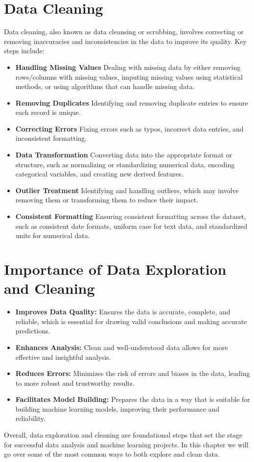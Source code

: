 \documentclass[
]{book}
\providecommand{\tightlist}{%
  \setlength{\itemsep}{0pt}\setlength{\parskip}{0pt}}
\begin{document}
\section*{Data Cleaning}\label{data-cleaning}

Data cleaning, also known as data cleansing or scrubbing, involves correcting or removing inaccuracies and inconsistencies in the data to improve its quality. Key steps include:

\begin{itemize}
\item
  \textbf{Handling Missing Values}
  Dealing with missing data by either removing rows/columns with missing values, imputing missing values using statistical methods, or using algorithms that can handle missing data.
\item
  \textbf{Removing Duplicates}
  Identifying and removing duplicate entries to ensure each record is unique.
\item
  \textbf{Correcting Errors}
  Fixing errors such as typos, incorrect data entries, and inconsistent formatting.
\item
  \textbf{Data Transformation}
  Converting data into the appropriate format or structure, such as normalizing or standardizing numerical data, encoding categorical variables, and creating new derived features.
\item
  \textbf{Outlier Treatment}
  Identifying and handling outliers, which may involve removing them or transforming them to reduce their impact.
\item
  \textbf{Consistent Formatting}
  Ensuring consistent formatting across the dataset, such as consistent date formats, uniform case for text data, and standardized units for numerical data.
\end{itemize}

\section*{Importance of Data Exploration and Cleaning}\label{importance-of-data-exploration-and-cleaning}

\begin{itemize}
\tightlist
\item
  \textbf{Improves Data Quality:} Ensures the data is accurate, complete, and reliable, which is essential for drawing valid conclusions and making accurate predictions.
\item
  \textbf{Enhances Analysis:} Clean and well-understood data allows for more effective and insightful analysis.
\item
  \textbf{Reduces Errors:} Minimizes the risk of errors and biases in the data, leading to more robust and trustworthy results.
\item
  \textbf{Facilitates Model Building:} Prepares the data in a way that is suitable for building machine learning models, improving their performance and reliability.
\end{itemize}

Overall, data exploration and cleaning are foundational steps that set the stage for successful data analysis and machine learning projects. In this chapter we will go over some of the most common ways to both explore and clean data.

  
\end{document}
